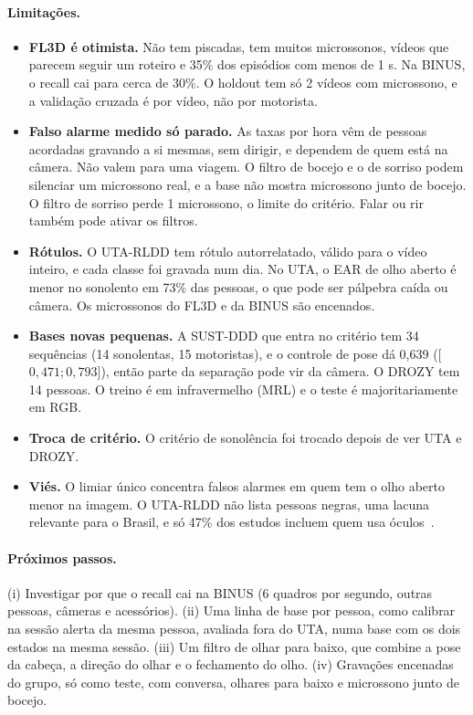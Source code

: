 \documentclass[11pt,a4paper]{article}
\newcommand{\ic}[2]{\textcolor{black!65}{[$#1$;\,$#2$]}}  %
\begin{document}
\paragraph{Limitações.}
\begin{itemize}
  \item \textbf{FL3D é otimista.} Não tem piscadas, tem muitos microssonos, vídeos que parecem seguir um roteiro e 35\% dos episódios com menos de 1 s. Na BINUS, o recall cai para cerca de 30\%. O holdout tem só 2 vídeos com microssono, e a validação cruzada é por vídeo, não por motorista.
  \item \textbf{Falso alarme medido só parado.} As taxas por hora vêm de pessoas acordadas gravando a si mesmas, sem dirigir, e dependem de quem está na câmera. Não valem para uma viagem. O filtro de bocejo e o de sorriso podem silenciar um microssono real, e a base não mostra microssono junto de bocejo. O filtro de sorriso perde 1 microssono, o limite do critério. Falar ou rir também pode ativar os filtros.
  \item \textbf{Rótulos.} O UTA-RLDD tem rótulo autorrelatado, válido para o vídeo inteiro, e cada classe foi gravada num dia. No UTA, o EAR de olho aberto é menor no sonolento em 73\% das pessoas, o que pode ser pálpebra caída ou câmera. Os microssonos do FL3D e da BINUS são encenados.
  \item \textbf{Bases novas pequenas.} A SUST-DDD que entra no critério tem 34 sequências (14 sonolentas, 15 motoristas), e o controle de pose dá 0,639 (\ic{0{,}471}{0{,}793}), então parte da separação pode vir da câmera. O DROZY tem 14 pessoas. O treino é em infravermelho (MRL) e o teste é majoritariamente em RGB.
  \item \textbf{Troca de critério.} O critério de sonolência foi trocado depois de ver UTA e DROZY.
  \item \textbf{Viés.} O limiar único concentra falsos alarmes em quem tem o olho aberto menor na imagem. O UTA-RLDD não lista pessoas negras, uma lacuna relevante para o Brasil, e só 47\% dos estudos incluem quem usa óculos~\cite{revisao126}.
\end{itemize}

\paragraph{Próximos passos.} (i) Investigar por que o recall cai na BINUS (6 quadros por segundo, outras pessoas, câmeras e acessórios). (ii) Uma linha de base por pessoa, como calibrar na sessão alerta da mesma pessoa, avaliada fora do UTA, numa base com os dois estados na mesma sessão. (iii) Um filtro de olhar para baixo, que combine a pose da cabeça, a direção do olhar e o fechamento do olho. (iv) Gravações encenadas do grupo, só como teste, com conversa, olhares para baixo e microssono junto de bocejo.
\end{document}
